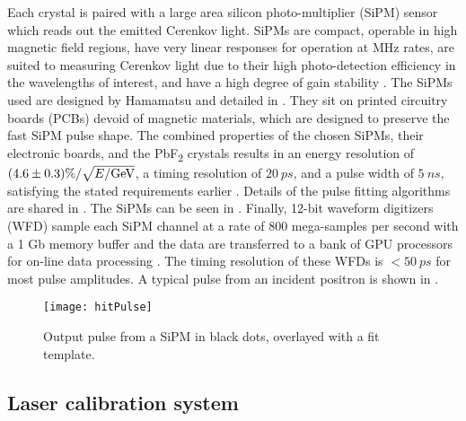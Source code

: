 Each crystal is paired with a large area silicon photo-multiplier (SiPM) sensor which reads out the emitted Cerenkov light. SiPMs are compact, operable in high magnetic field regions, have very linear responses for operation at MHz rates, are suited to measuring Cerenkov light due to their high photo-detection efficiency in the wavelengths of interest, and have a high degree of gain stability \cite{Kaspar:2016ofv}. The SiPMs used are designed by Hamamatsu and detailed in . They sit on printed circuitry boards (PCBs) devoid of magnetic materials, which are designed to preserve the fast SiPM pulse shape. The combined properties of the chosen SiPMs, their electronic boards, and the PbF\textsubscript{2} crystals results in an energy resolution of $(4.6 \pm 0.3) \% / \sqrt{E/\text{G\text{e\kern-0.15ex V}}}$, a timing resolution of $\SI{20}{ps}$, and a pulse width of $\SI{5}{ns}$, satisfying the stated requirements earlier \cite{Fienberg:2014kka,Kaspar:2016ofv}. Details of the pulse fitting algorithms are shared in . The SiPMs can be seen in . Finally, 12-bit waveform digitizers (WFD) sample each SiPM channel at a rate of 800 mega-samples per second with a 1 Gb memory buffer and the data are transferred to a bank of GPU processors for on-line data processing \cite{Sweigart:2016jty}. The timing resolution of these WFDs is $<\SI{50}{ps}$ for most pulse amplitudes. A typical pulse from an incident positron is shown in .

\begin{figure}[]
\centering
        \texttt{[image: hitPulse]}
\caption[SiPM pulse]{Output pulse from a SiPM in black dots, overlayed with a fit template.}
\label{fig:calopulse}
\end{figure}


\subsection{Laser calibration system}
\label{sub:LaserCalibrationSystem}


